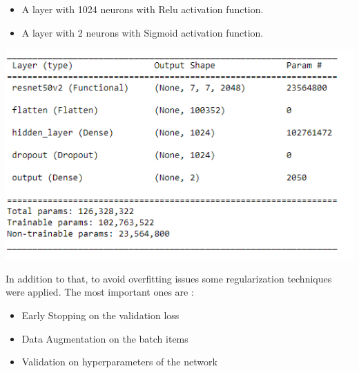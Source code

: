 \begin{flushleft}
\begin{itemize}
    \item A layer with 1024 neurons with Relu activation function.
    \item A layer with 2 neurons with Sigmoid activation function.
\end{itemize}
\begin{center}
\includegraphics[scale = 0.70]{Images/ModelUsed.PNG}    
\end{center}

In addition to that, to avoid overfitting issues some regularization techniques were applied. The most important ones are :
\begin{itemize}
    \item Early Stopping on the validation loss
    \item Data Augmentation on the batch items
    \item Validation on hyperparameters of the network 
\end{itemize}




\end{flushleft}